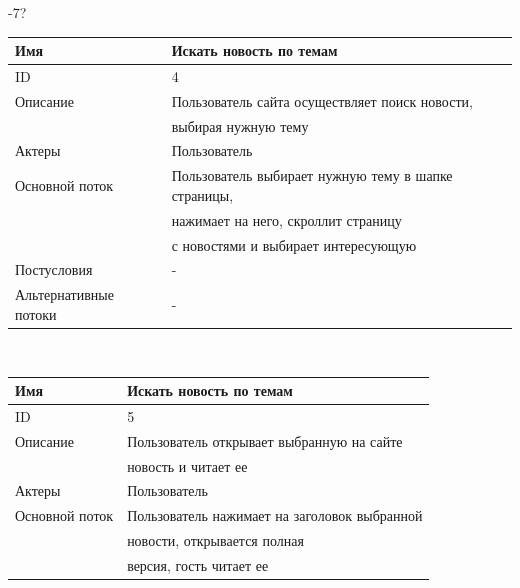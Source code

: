 \newpage
{}-7?
\begin{center}
    \small
    \begin{tabular}{|l|l|}
        \hline
        Имя                   & Искать новость по темам                             \\
        \hline
        ID                    & 4                                                   \\
        \hline
        Описание              & Пользователь сайта осуществляет поиск новости,      \\
        & выбирая нужную тему                                 \\
        \hline
        Актеры                & Пользователь                                        \\
        \hline
        Основной поток        & Пользователь выбирает нужную тему в шапке страницы, \\
        & нажимает на него, скроллит страницу                 \\
        & с новостями и выбирает интересующую                 \\
        \hline
        Постусловия           & -                                                   \\
        \hline
        Альтернативные потоки & -                                                   \\
        \hline
    \end{tabular}\\
    \vspace{0.5cm}
    \begin{tabular}{|l|l|}
        \hline
        Имя                   & Искать новость по темам                      \\
        \hline
        ID                    & 5                                            \\
        \hline
        Описание              & Пользователь открывает выбранную на сайте    \\
        & новость и читает ее                          \\
        \hline
        Актеры                & Пользователь                                 \\
        \hline
        Основной поток        & Пользователь нажимает на заголовок выбранной \\
        & новости, открывается полная                  \\
        & версия, гость читает ее                      \\

\end{tabular}
\end{center}

